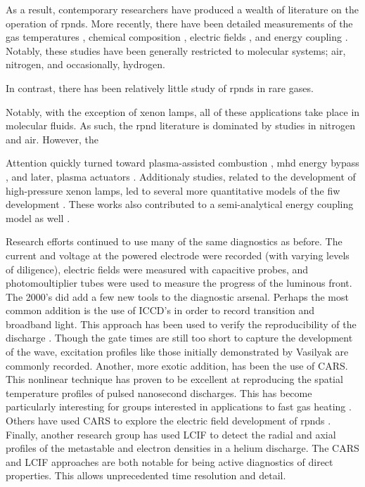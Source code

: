 As a result, contemporary researchers have produced a wealth of literature on
the operation of \acs{rpnds}. More recently, there have been detailed
measurements of the gas temperatures \cite{Pilla2006, Pancheshnyi2006,
Nishihara2006, Bao2007, Lou2007, Pai2009, Zuzeek2010, Nishihara2011}, chemical
composition \cite{Bao2007, Lou2007, Pai2009}, electric fields \cite{Ito2009,
Ito2010, Muller2011a}, and energy coupling \cite{Macheret2006, Pancheshnyi2006}.
Notably, these studies have been generally restricted to molecular systems; air,
nitrogen, and occasionally, hydrogen.

In contrast, there has been relatively little study of \acs{rpnd}s in rare
gases. 

Notably, with the exception of xenon lamps, all of these applications take place
in molecular fluids. As such, the \acs{rpnd} literature is dominated by studies
in nitrogen and air. However, the 

Attention quickly turned toward plasma-assisted combustion
\cite{Starikovskaia2006}, mhd energy bypass \cite{Macheret2002}, and later,
plasma actuators \cite{Adamovich2009}. Additionaly studies, related to the
development of high-pressure xenon lamps, led to several more quantitative
models of the fiw development \cite{Nikandrov2008, Tsendin2009}. These works
also contributed to a semi-analytical energy coupling model as well
\cite{Adamovich2009}.

Research efforts continued to use many of the same diagnostics as before. The
current and voltage at the powered electrode were recorded (with varying levels
of diligence), electric fields were measured with capacitive probes, and
photomoultiplier tubes were used to measure the progress of the luminous front.
The 2000's did add a few new tools to the diagnostic arsenal. Perhaps the most
common addition is the use of ICCD's in order to record transition and broadband
light. This approach has been used to verify the reproducibility of the
discharge \cite{Adamovich2009}. Though the gate times are still too short to
capture the development of the wave, excitation profiles like those initially
demonstrated by Vasilyak\cite{Vasilyak1994} are commonly recorded. Another, more
exotic addition, has been the use of CARS. This nonlinear technique has proven
to be excellent at reproducing the spatial temperature profiles of pulsed
nanosecond discharges. This has become particularly interesting for groups
interested in applications to fast gas heating \cite{Zuzeek2010}. Others have
used CARS to explore the electric field development of rpnds \cite{Ito2010,
Ito2010a}. Finally, another research group has used LCIF to detect the radial
and axial profiles of the metastable and electron densities in a helium
discharge. The CARS and LCIF approaches are both notable for being active
diagnostics of direct properties. This allows unprecedented time resolution and
detail.
